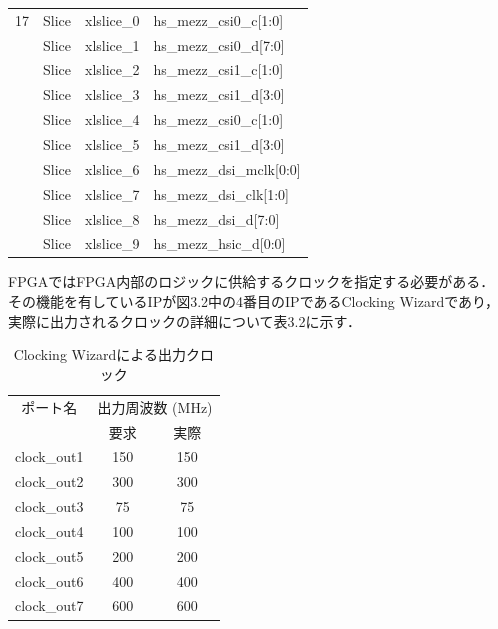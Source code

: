 \documentclass[11pt,a4j]{jreport}
\begin{document}
\begin{table}[H]
{\begin{tabular}{clll}
    17 & Slice & xlslice_0 & hs_mezz_csi0_c[1:0] \\
    & Slice & xlslice_1 & hs_mezz_csi0_d[7:0] \\
    & Slice & xlslice_2 & hs_mezz_csi1_c[1:0] \\
    & Slice & xlslice_3 & hs_mezz_csi1_d[3:0] \\
    & Slice & xlslice_4 & hs_mezz_csi0_c[1:0] \\
    & Slice & xlslice_5 & hs_mezz_csi1_d[3:0] \\
    & Slice & xlslice_6 & hs_mezz_dsi_mclk[0:0] \\
    & Slice & xlslice_7 & hs_mezz_dsi_clk[1:0] \\
    & Slice & xlslice_8 & hs_mezz_dsi_d[7:0] \\
    & Slice & xlslice_9 & hs_mezz_hsic_d[0:0] \\
  \hline
  \end{tabular}
  }
\end{table}
FPGAではFPGA内部のロジックに供給するクロックを指定する必要がある．
その機能を有しているIPが図3.2中の4番目のIPであるClocking Wizardであり，
実際に出力されるクロックの詳細について表3.2に示す．
\begin{table}[H]
  \caption{Clocking Wizardによる出力クロック}
  \label{physics}
  \centering
  \begin{tabular}{ccc}
    \hline
    ポート名 & \multicolumn{2}{c}{出力周波数 (MHz)} \\
    \cmidrule(lr){2-3}
     & 要求 & 実際 \\
    \hline
    clock_out1 & 150 & 150 \\
    clock_out2 & 300 & 300 \\
    clock_out3 & 75 & 75 \\
    clock_out4 & 100 & 100 \\
    clock_out5 & 200 & 200 \\
    clock_out6 & 400 & 400 \\
    clock_out7 & 600 & 600 \\
    \hline
    \end{tabular}
\end{table}
\end{document}
